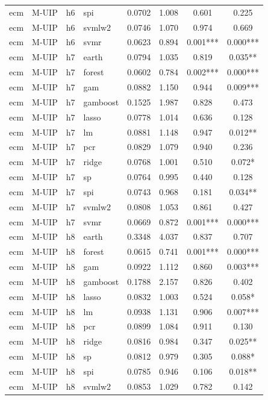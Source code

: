 \begin{ThreePartTable}
\begin{longtable}[t]{llclcccc}
ecm & M-UIP & h6 & spi & 0.0702 & 1.008 & 0.601 & 0.225\\
ecm & M-UIP & h6 & svmlw2 & 0.0746 & 1.070 & 0.974 & 0.669\\
ecm & M-UIP & h6 & svmr & 0.0623 & 0.894 & 0.001*** & 0.000***\\
\addlinespace
ecm & M-UIP & h7 & earth & 0.0794 & 1.035 & 0.819 & 0.035**\\
ecm & M-UIP & h7 & forest & 0.0602 & 0.784 & 0.002*** & 0.000***\\
ecm & M-UIP & h7 & gam & 0.0882 & 1.150 & 0.944 & 0.009***\\
ecm & M-UIP & h7 & gamboost & 0.1525 & 1.987 & 0.828 & 0.473\\
ecm & M-UIP & h7 & lasso & 0.0778 & 1.014 & 0.636 & 0.128\\
ecm & M-UIP & h7 & lm & 0.0881 & 1.148 & 0.947 & 0.012**\\
ecm & M-UIP & h7 & pcr & 0.0829 & 1.079 & 0.940 & 0.236\\
ecm & M-UIP & h7 & ridge & 0.0768 & 1.001 & 0.510 & 0.072*\\
ecm & M-UIP & h7 & sp & 0.0764 & 0.995 & 0.440 & 0.128\\
ecm & M-UIP & h7 & spi & 0.0743 & 0.968 & 0.181 & 0.034**\\
ecm & M-UIP & h7 & svmlw2 & 0.0808 & 1.053 & 0.861 & 0.427\\
ecm & M-UIP & h7 & svmr & 0.0669 & 0.872 & 0.001*** & 0.000***\\
\addlinespace
ecm & M-UIP & h8 & earth & 0.3348 & 4.037 & 0.837 & 0.707\\
ecm & M-UIP & h8 & forest & 0.0615 & 0.741 & 0.001*** & 0.000***\\
ecm & M-UIP & h8 & gam & 0.0922 & 1.112 & 0.860 & 0.003***\\
ecm & M-UIP & h8 & gamboost & 0.1788 & 2.157 & 0.826 & 0.402\\
ecm & M-UIP & h8 & lasso & 0.0832 & 1.003 & 0.524 & 0.058*\\
ecm & M-UIP & h8 & lm & 0.0938 & 1.131 & 0.906 & 0.007***\\
ecm & M-UIP & h8 & pcr & 0.0899 & 1.084 & 0.911 & 0.130\\
ecm & M-UIP & h8 & ridge & 0.0816 & 0.984 & 0.347 & 0.025**\\
ecm & M-UIP & h8 & sp & 0.0812 & 0.979 & 0.305 & 0.088*\\
ecm & M-UIP & h8 & spi & 0.0785 & 0.946 & 0.106 & 0.018**\\
ecm & M-UIP & h8 & svmlw2 & 0.0853 & 1.029 & 0.782 & 0.142\\

\end{longtable}
\end{ThreePartTable}
